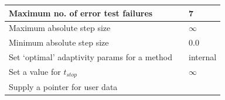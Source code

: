 \documentclass[letterpaper,10pt,english]{sphinxmanual}
\begin{document}
\begin{tabulary}{\linewidth}{|L|L|L|}
Maximum no. of error test failures
 & 
{\hyperref[c_interface/User_callable:ARKodeSetMaxErrTestFails]{}}
 & 
7
\\\hline

Maximum absolute step size
 & 
{\hyperref[c_interface/User_callable:ARKodeSetMaxStep]{}}
 & 
$\infty$
\\\hline

Minimum absolute step size
 & 
{\hyperref[c_interface/User_callable:ARKodeSetMinStep]{}}
 & 
0.0
\\\hline

Set `optimal' adaptivity params for a method
 & 
{\hyperref[c_interface/User_callable:ARKodeSetOptimalParams]{}}
 & 
internal
\\\hline

Set a value for $t_{stop}$
 & 
{\hyperref[c_interface/User_callable:ARKodeSetStopTime]{}}
 & 
$\infty$
\\\hline

Supply a pointer for user data
 & 
{\hyperref[c_interface/User_callable:ARKodeSetUserData]{}}
 & 
\\\hline
\end{tabulary}

\end{document}
